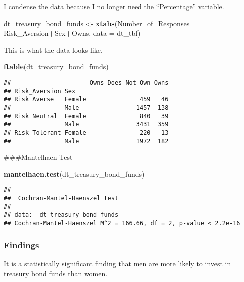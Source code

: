 \documentclass[
]{article}
\newenvironment{Shaded}{\begin{snugshade}}{\end{snugshade}}
\newcommand{\DataTypeTok}[1]{\textcolor[rgb]{0.13,0.29,0.53}{#1}}
\newcommand{\KeywordTok}[1]{\textcolor[rgb]{0.13,0.29,0.53}{\textbf{#1}}}
\newcommand{\NormalTok}[1]{#1}
\newcommand{\OperatorTok}[1]{\textcolor[rgb]{0.81,0.36,0.00}{\textbf{#1}}}
\newcommand{\StringTok}[1]{\textcolor[rgb]{0.31,0.60,0.02}{#1}}
\begin{document}
I condense the data because I no longer need the ``Percentage''
variable.

\begin{Shaded}
\begin{Highlighting}[]
\NormalTok{dt_treasury_bond_funds <-}\StringTok{ }\KeywordTok{xtabs}\NormalTok{(Number_of_Responses }\OperatorTok{~}\StringTok{ }\NormalTok{Risk_Aversion}\OperatorTok{+}\NormalTok{Sex}\OperatorTok{+}\NormalTok{Owns, }\DataTypeTok{data =}\NormalTok{ dt_tbf)}
\end{Highlighting}
\end{Shaded}

This is what the data looks like.

\begin{Shaded}
\begin{Highlighting}[]
\KeywordTok{ftable}\NormalTok{(dt_treasury_bond_funds)}
\end{Highlighting}
\end{Shaded}

\begin{verbatim}
##                      Owns Does Not Own Owns
## Risk_Aversion Sex                          
## Risk Averse   Female               459   46
##               Male                1457  138
## Risk Neutral  Female               840   39
##               Male                3431  359
## Risk Tolerant Female               220   13
##               Male                1972  182
\end{verbatim}

\#\#\#Mantelhaen Test

\begin{Shaded}
\begin{Highlighting}[]
\KeywordTok{mantelhaen.test}\NormalTok{(dt_treasury_bond_funds)}
\end{Highlighting}
\end{Shaded}

\begin{verbatim}
## 
##  Cochran-Mantel-Haenszel test
## 
## data:  dt_treasury_bond_funds
## Cochran-Mantel-Haenszel M^2 = 166.66, df = 2, p-value < 2.2e-16
\end{verbatim}

\hypertarget{findings-4}{%
\subsubsection{Findings}\label{findings-4}}

It is a statistically significant finding that men are more likely to
invest in treasury bond funds than women.
\end{document}
